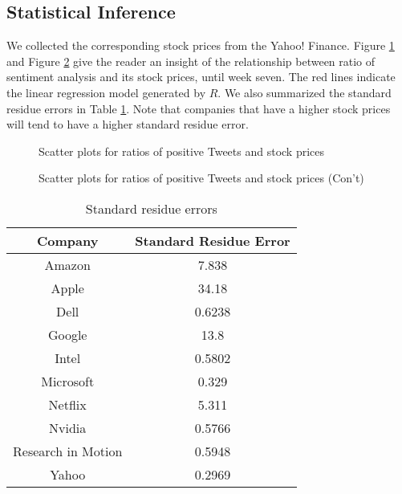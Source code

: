 \documentclass[12pt]{article}
\begin{document}
\subsection{Statistical Inference}
We collected the corresponding stock prices from the Yahoo! Finance. Figure \ref{xyplots-ratio-price} and Figure \ref{xyplots-ratio-price-02} give the reader an insight of the relationship between ratio of sentiment analysis and its stock prices, until week seven. The red lines indicate the linear regression model generated by $R$. We also summarized the standard residue errors in Table \ref{residue-errors}. Note that companies that have a higher stock prices will tend to have a higher standard residue error.

\begin{figure}
\centering
\caption{Scatter plots for ratios of positive Tweets and stock prices}
\label{xyplots-ratio-price}
\end{figure}

\begin{figure}
\centering
\caption{Scatter plots for ratios of positive Tweets and stock prices (Con't)}
\label{xyplots-ratio-price-02}
\end{figure}

\begin{table}
\begin{center}
    \begin{tabular}{ | c || c | }
        \hline
        \textbf{Company} & \textbf{Standard Residue Error} \\ \hline
        \hline
        Amazon & 7.838 \\ \hline
        Apple & 34.18 \\ \hline
        Dell & 0.6238 \\ \hline
        Google & 13.8 \\ \hline
        Intel & 0.5802 \\ \hline
        Microsoft & 0.329 \\ \hline
        Netflix & 5.311 \\ \hline
        Nvidia & 0.5766 \\ \hline
        Research in Motion & 0.5948 \\ \hline
        Yahoo & 0.2969 \\ \hline
    \end{tabular}
\caption{Standard residue errors}
\label{residue-errors}
\end{center}
\end{table}
\end{document}
